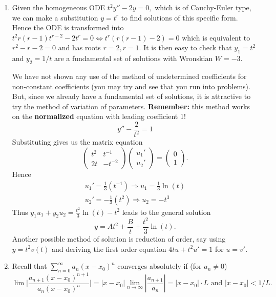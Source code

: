 \documentclass[a4paper,12pt,leqno]{article}
\begin{document}

\begin{enumerate}
\item Given the homogeneous ODE $t^2 y '' - 2y = 0,$ which is of Cauchy-Euler type, we can make a substitution $y = t^r$ to find solutions of this specific form. Hence the ODE is transformed into $t^2r(r-1)t^{r-2} - 2t^r = 0 \Leftrightarrow t^r(r(r-1) - 2) = 0$ which is equivalent to $r^2 - r -2 = 0$ and has roots $r = 2, r = 1.$ It is then easy to check that $y_1 = t^2$ and $y_2 = 1/t$ are a fundamental set of solutions with Wronskian $W = -3.$

We have not shown any use of the method of undetermined coefficients for non-constant coefficients (you may try and see that you run into problems). But, since we already have a fundamental set of solutions, it is attractive to try the method of variation of parameters. \textbf{Remember:} this method works on the \textbf{normalized} equation with leading coefficient 1!
\[ y'' - \frac{2}{t^2} = 1 \]
Substituting gives us the matrix equation 
\[ \begin{pmatrix}
t^2 & t^{-1} \\
2t & -t^{-2} 
\end{pmatrix}
\begin{pmatrix}
u_1' \\
u_2'
\end{pmatrix}
= 
\begin{pmatrix}
0 \\
1
\end{pmatrix}.\]
Hence 
\begin{align*}
u_1' = \frac{1}{3}(t^{-1}) \Rightarrow u_1 = \frac{1}{3} \ln(t) \\
u_2' = -\frac{1}{3}(t^2) \Rightarrow u_2 = -t^3
\end{align*}
Thus $y_1 u_1 + y_2 u_2 = \frac{t^2}{3} \ln(t) - t^2$
leads to the general solution 
\[ y = At^2 + \frac{B}{t} + \frac{t^2}{3} \ln(t). \]
Another possible method of solution is reduction of order, say using $y = t^2 v(t)$ and deriving the first order equation $4tu + t^2 u' = 1$ for $u = v'.$ 
\item Recall that 
$ \sum_{n=0}^\infty a_n (x-x_0)^n$ converges absolutely if (for $a_n \neq 0$) 
\[ \lim \lvert \frac{a_{n+1}(x-x_0)^{n+1}}{a_n(x-x_0)^n}| = \lvert x-x_0| \lim_{n \rightarrow \infty} |\frac{a_{n+1}}{a_n}| = |x-x_0|\cdot L \text{ and } |x - x_0| < 1/L.\]
\begin{enumerate}

\end{enumerate}
\end{enumerate}
\end{document}
